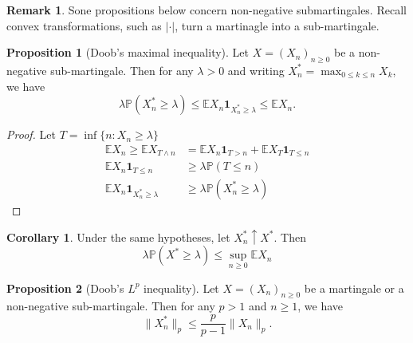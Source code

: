 \documentclass[parskip=full]{article}
\theoremstyle{definition}
\newtheorem{corollary}{Corollary}
\newtheorem{proposition}{Proposition}[section]
\newtheorem*{remark}{Remark}
\newcommand{\Pbb}{\mathbb{P}}
\newcommand{\1}{\mathbbm{1}}
\newcommand{\E}{\mathbb{E}}
\begin{document}
\begin{remark}
  Sone propositions below concern non-negative submartingales. Recall convex transformations, such as $|\cdot|$, turn a martinagle into a sub-martingale.
\end{remark}

\begin{proposition}[Doob's maximal inequality]
  Let $X = (X_n)_{n \geq 0}$ be a non-negative sub-martingale. Then for any $\lambda > 0$ and writing $X^*_n = \max_{0 \leq k \leq n} X_k$, we have
  \[
    \lambda \Pbb(X^*_n \geq \lambda) \leq \E X_n \mathbf{1}_{X^*_n \geq \lambda} \leq \E X_n.
  \]
\end{proposition}

\begin{proof}
  Let $T = \inf\{n: X_n \geq \lambda\}$
  \begin{align*}
    \E X_n \geq \E X_{T \wedge n} &= \E X_n \mathbf{1}_{T > n} + \E X_T \mathbf{1}_{T \leq n} \\
    \E X_n \mathbf{1}_{T \leq n} &\geq \lambda \Pbb(T \leq n) \\
    \E X_n \mathbf{1}_{X^*_n \geq \lambda} &\geq \lambda \Pbb(X^*_n \geq \lambda)
  \end{align*}
\end{proof}

\begin{corollary}
  Under the same hypotheses, let $X^*_n \uparrow X^*$. Then
  \[
    \lambda \Pbb(X^* \geq \lambda) \leq \sup_{n \geq 0} \E X_n
  \]
\end{corollary}

\begin{proposition}[Doob's $L^p$ inequality]
  Let $X = (X_n)_{n \geq 0}$ be a martingale or a non-negative sub-martingale. Then for any $p > 1$ and $n \geq 1$, we have
  \[
    \|X^*_n\|_p \leq \frac{p}{p - 1} \|X_n\|_p.
  \]
\end{proposition}
\end{document}
